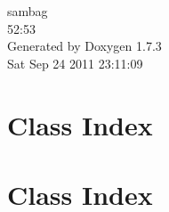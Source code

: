 \documentclass[a4paper]{book}
\begin{document}
\hypersetup{pageanchor=false}
\begin{titlepage}
\vspace*{7cm}
\begin{center}
{\Large sambag \\[1ex]\large 52:53 }\\
\vspace*{1cm}
{\large Generated by Doxygen 1.7.3}\\
\vspace*{0.5cm}
{\small Sat Sep 24 2011 23:11:09}\\
\end{center}
\end{titlepage}
\clearemptydoublepage
{}
\tableofcontents
\clearemptydoublepage
{}
\hypersetup{pageanchor=true}
\chapter{Class Index}

\chapter{Class Index}

\end{document}
